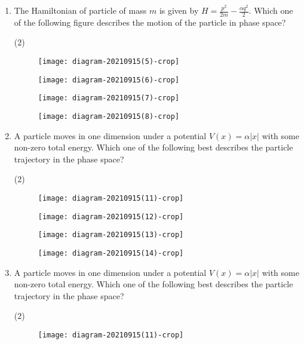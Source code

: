 \begin{enumerate}
	\item The Hamiltonian of particle of mass $m$ is given by $H=\frac{p^{2}}{2 m}-\frac{\alpha q^{2}}{2}$. Which one of the following figure describes the motion of the particle in phase space?
	{}

\begin{tasks}(2)
	\task[\textbf{A.}]\begin{figure}[H]
		\centering
		\texttt{[image: diagram-20210915(5)-crop]}
	\end{figure}
	\task[\textbf{B.}]\begin{figure}[H]
		\centering
		\texttt{[image: diagram-20210915(6)-crop]}
	\end{figure}
	\task[\textbf{C.}]\begin{figure}[H]
		\centering
		\texttt{[image: diagram-20210915(7)-crop]}
	\end{figure}
	\task[\textbf{D.}]\begin{figure}[H]
		\centering
		\texttt{[image: diagram-20210915(8)-crop]}
	\end{figure}
\end{tasks}
	\item A particle moves in one dimension under a potential $V(x)=\alpha|x|$ with some non-zero total energy. Which one of the following best describes the particle trajectory in the phase space?
	{}

\begin{tasks}(2)
	\task[\textbf{A.}]\begin{figure}[H]
		\centering
		\texttt{[image: diagram-20210915(11)-crop]}
		
	\end{figure}
	\task[\textbf{B.}]\begin{figure}[H]
		\centering
		\texttt{[image: diagram-20210915(12)-crop]}
	\end{figure}
	\task[\textbf{C.}]\begin{figure}[H]
		\centering
		\texttt{[image: diagram-20210915(13)-crop]}
	\end{figure}
	\task[\textbf{D.}]\begin{figure}[H]
		\centering
		\texttt{[image: diagram-20210915(14)-crop]}
	\end{figure}
\end{tasks}	
	\item A particle moves in one dimension under a potential $V(x)=\alpha|x|$ with some non-zero total energy. Which one of the following best describes the particle trajectory in the phase space?
	{}
\begin{tasks}(2)
	\task[\textbf{A.}]\begin{figure}[H]
		\centering
		\texttt{[image: diagram-20210915(11)-crop]}
		

\end{figure}
\end{tasks}
\end{enumerate}
